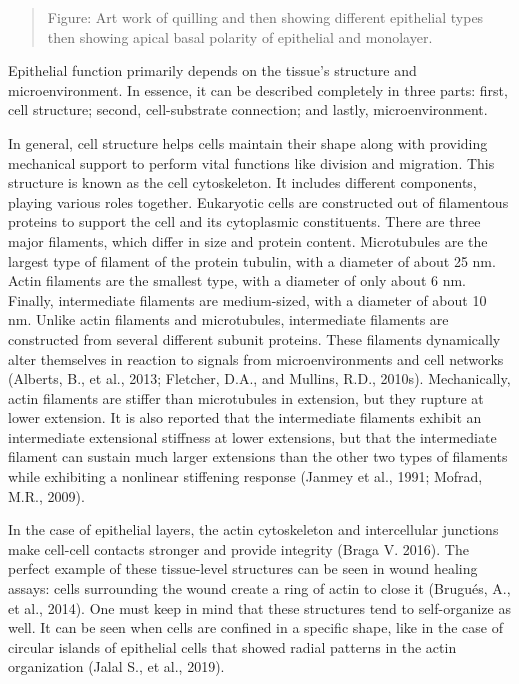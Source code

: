 \begin{quote}
	Figure: Art work of quilling and then showing different epithelial types
	then showing apical basal polarity of epithelial and monolayer.
\end{quote}

Epithelial function primarily depends on the tissue's structure and
microenvironment. In essence, it can be described completely in three
parts: first, cell structure; second, cell-substrate connection; and
lastly, microenvironment.

In general, cell structure helps cells maintain their shape along with
providing mechanical support to perform vital functions like division
and migration. This structure is known as the cell cytoskeleton. It
includes different components, playing various roles together.
Eukaryotic cells are constructed out of filamentous proteins to support
the cell and its cytoplasmic constituents. There are three major
filaments, which differ in size and protein content. Microtubules are
the largest type of filament of the protein tubulin, with a diameter of
about 25 nm. Actin filaments are the smallest type, with a diameter of
only about 6 nm. Finally, intermediate filaments are medium-sized, with
a diameter of about 10 nm. Unlike actin filaments and microtubules,
intermediate filaments are constructed from several different subunit
proteins. These filaments dynamically alter themselves in reaction to
signals from microenvironments and cell networks (Alberts, B., et al.,
2013; Fletcher, D.A., and Mullins, R.D., 2010s). Mechanically, actin
filaments are stiffer than microtubules in extension, but they rupture
at lower extension. It is also reported that the intermediate filaments
exhibit an intermediate extensional stiffness at lower extensions, but
that the intermediate filament can sustain much larger extensions than
the other two types of filaments while exhibiting a nonlinear stiffening
response (Janmey et al., 1991; Mofrad, M.R., 2009).

In the case of epithelial layers, the actin cytoskeleton and
intercellular junctions make cell-cell contacts stronger and provide
integrity (Braga V. 2016). The perfect example of these tissue-level
structures can be seen in wound healing assays: cells surrounding the
wound create a ring of actin to close it (Brugués, A., et al., 2014).
One must keep in mind that these structures tend to self-organize as
well. It can be seen when cells are confined in a specific shape, like
in the case of circular islands of epithelial cells that showed radial
patterns in the actin organization (Jalal S., et al., 2019).

